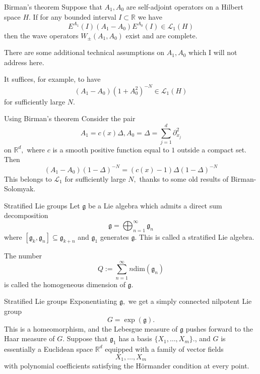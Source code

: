 \documentclass{beamer}
\numberwithin{equation}{section}
\theoremstyle{plain}
\theoremstyle{plain}
\theoremstyle{definition}
\theoremstyle{plain}
\theoremstyle{plain}
\theoremstyle{definition}
\newcommand{\Rl}{\mathbb{R}}
\newcommand{\Lc}{\mathcal{L}}
\newcommand{\gf}{\mathfrak{g}}
\begin{document}
\begin{frame}{Birman's theorem}
  Suppose that $A_1,A_0$ are self-adjoint operators on a Hilbert space $H.$ If for any bounded interval $I\subset \Rl$ we have
  \[
    E^{A_1}(I)(A_1-A_0)E^{A_0}(I) \in \Lc_1(H)
  \]
  then the wave operators $W_{\pm}(A_1,A_0)$ exist and are complete.\\\pause

  {\color{red} There are some additional technical assumptions on $A_1,A_0$ which I will not address here.}\\ \pause

  It suffices, for example, to have
  \[
    (A_1-A_0)(1+A_0^2)^{-N} \in \Lc_1(H)
  \]
  for sufficiently large $N.$
\end{frame}

\begin{frame}{Using Birman's theorem}
  Consider the pair
  \[
      A_1 =c(x)\Delta, A_0 = \Delta = \sum_{j=1}^d \partial_{x_j}^2
  \]
  on $\Rl^d,$ where $c$ is a smooth positive function equal to $1$ outside a compact set. Then
  \[
    (A_1-A_0)(1-\Delta)^{-N} =(c(x)-1)\Delta (1-\Delta)^{-N}
  \]
  This belongs to $\Lc_1$ for sufficiently large $N,$ thanks to some old results of Birman-Solomyak.
\end{frame}


\begin{frame}{Stratified Lie groups}
  Let $\gf$ be a Lie algebra which admits a direct sum decomposition
  \[
    \gf = \bigoplus_{n=1}^\infty \gf_n
  \]
  where $[\gf_k,\gf_n] \subseteq \gf_{k+n}$ and $\gf_1$ generates $\gf.$
  This is called a stratified Lie algebra.

  The number
  \[
    Q := \sum_{n=1}^\infty n\mathrm{dim}(\gf_n)
  \]
  is called the homogeneous dimension of $\gf.$
\end{frame}

\begin{frame}{Stratified Lie groups}
  Exponentiating $\gf,$ we get a simply connected nilpotent Lie group
  \[
    G = \exp(\gf).
  \]
  This is a homeomorphism, and the Lebesgue measure of $\gf$ pushes forward to the Haar measure of $G.$
  Suppose that $\gf_1$ has a basis $\{X_1,\ldots,X_m\}.$, and $G$ is essentially a Euclidean space $\Rl^d$ equipped with a family of vector fields
  \[
    X_1,\ldots,X_m
  \]
  with polynomial coefficients satisfying the H\"ormander condition at every point.
\end{frame}
\end{document}
